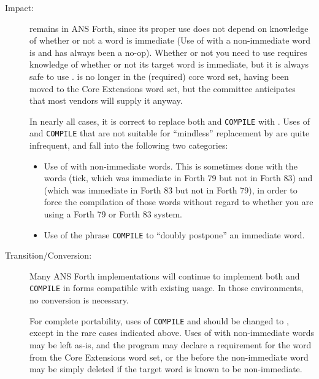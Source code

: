 \begin{description}
\item[Impact:]
	\word{[COMPILE]} remains in ANS Forth, since its proper use does
	not depend on knowledge of whether or not a word is immediate (Use
	of \word{[COMPILE]} with a non-immediate word is and has always
	been a no-op). Whether or not you need to use \word{[COMPILE]}
	requires knowledge of whether or not its target word is immediate,
	but it is always safe to use \word{[COMPILE]}. \word{[COMPILE]}
	is no longer in the (required) core word set, having been moved
	to the Core Extensions word set, but the committee anticipates
	that most vendors will supply it anyway.

	In nearly all cases, it is correct to replace both \word{[COMPILE]}
	and \texttt{COMPILE} with . Uses of \word{[COMPILE]}
	and \texttt{COMPILE} that are not suitable for ``mindless'' replacement
	by  are quite infrequent, and fall into the following
	two categories:

	\begin{itemize}
	\item Use of \word{[COMPILE]} with non-immediate words. This is
		sometimes done with the words  (tick, which was
		immediate in Forth 79 but not in Forth 83) and 
		(which was immediate in Forth 83 but not in Forth 79), in
		order to force the compilation of those words without regard
		to whether you are using a Forth 79 or Forth 83 system.

	\item Use of the phrase \texttt{COMPILE} \word{[COMPILE]}
		 to ``doubly postpone'' an immediate word.
	\end{itemize}

\item[Transition/Conversion:]
	Many ANS Forth implementations will continue to implement both
	\word{[COMPILE]} and \texttt{COMPILE} in forms compatible with
	existing usage. In those environments, no conversion is necessary.

	For complete portability, uses of \texttt{COMPILE} and \word{[COMPILE]}
	should be changed to , except in the rare cases
	indicated above. Uses of \word{[COMPILE]} with non-immediate words
	may be left as-is, and the program may declare a requirement for
	the word \word{[COMPILE]} from the Core Extensions word set, or
	the \word{[COMPILE]} before the non-immediate word may be simply
	deleted if the target word is known to be non-immediate.


\end{description}
